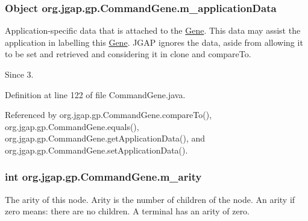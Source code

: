 \hypertarget{classorg_1_1jgap_1_1gp_1_1_command_gene_a454ff64d5021d90fcd1ecc879bddfc82}{
\subsubsection[{m\-\_\-application\-Data}]{\setlength{\rightskip}{0pt plus 5cm}Object org.\-jgap.\-gp.\-Command\-Gene.\-m\-\_\-application\-Data\hspace{0.3cm}{\ttfamily [private]}}}\label{classorg_1_1jgap_1_1gp_1_1_command_gene_a454ff64d5021d90fcd1ecc879bddfc82}
Application-\/specific data that is attached to the \hyperlink{interfaceorg_1_1jgap_1_1_gene}{Gene}. This data may assist the application in labelling this \hyperlink{interfaceorg_1_1jgap_1_1_gene}{Gene}. J\-G\-A\-P ignores the data, aside from allowing it to be set and retrieved and considering it in clone and compare\-To.

\begin{DoxySince}{Since}
3. 
\end{DoxySince}


Definition at line 122 of file Command\-Gene.\-java.



Referenced by org.\-jgap.\-gp.\-Command\-Gene.\-compare\-To(), org.\-jgap.\-gp.\-Command\-Gene.\-equals(), org.\-jgap.\-gp.\-Command\-Gene.\-get\-Application\-Data(), and org.\-jgap.\-gp.\-Command\-Gene.\-set\-Application\-Data().

\hypertarget{classorg_1_1jgap_1_1gp_1_1_command_gene_a951edb6bc5891e6a1dd2a58aab9c7b58}{
\subsubsection[{m\-\_\-arity}]{\setlength{\rightskip}{0pt plus 5cm}int org.\-jgap.\-gp.\-Command\-Gene.\-m\-\_\-arity\hspace{0.3cm}{\ttfamily [private]}}}\label{classorg_1_1jgap_1_1gp_1_1_command_gene_a951edb6bc5891e6a1dd2a58aab9c7b58}
The arity of this node. Arity is the number of children of the node. An arity if zero means\-: there are no children. A terminal has an arity of zero. 

